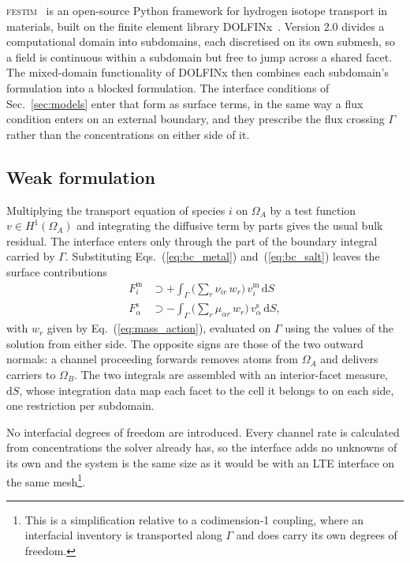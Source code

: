 \documentclass[5p]{elsarticle}
\newcommand{\FESTIM}{\textsc{festim}}
\begin{document}
\FESTIM{}~\cite{dark_festim_2026} is an open-source Python framework for hydrogen isotope transport in materials, built on the finite element library DOLFINx~\cite{baratta_dolfinx_2023}.
Version 2.0 divides a computational domain into subdomains, each discretised on its own submesh, so a field is continuous within a subdomain but free to jump across a shared facet.
The mixed-domain functionality of DOLFINx then combines each subdomain's formulation into a blocked formulation.
The interface conditions of Sec.~\ref{sec:models} enter that form as surface terms, in the same way a flux condition enters on an external boundary, and they prescribe the flux crossing $\Gamma$ rather than the concentrations on either side of it.

\subsection{Weak formulation}
\label{sec:weak}

Multiplying the transport equation of species $i$ on $\Omega_A$ by a test function $v \in H^1(\Omega_A)$ and integrating the diffusive term by parts gives the usual bulk residual.
The interface enters only through the part of the boundary integral carried by $\Gamma$.
Substituting Eqs.~(\ref{eq:bc_metal}) and~(\ref{eq:bc_salt}) leaves the surface contributions
\begin{align}
    F^{\mathrm{m}}_i &\supset
    +\int_\Gamma \Big(\sum_r \nu_{ir}\, w_r\Big)\,
        v^{\mathrm{m}}_i \,\mathrm{d}S
    \label{eq:weak_metal}\\
    F^{\mathrm{s}}_\alpha &\supset
    -\int_\Gamma \Big(\sum_r \mu_{\alpha r}\, w_r\Big)\,
        v^{\mathrm{s}}_\alpha \,\mathrm{d}S ,
    \label{eq:weak_salt}
\end{align}
with $w_r$ given by Eq.~(\ref{eq:mass_action}), evaluated on $\Gamma$ using the values of the solution from either side.
The opposite signs are those of the two outward normals: a channel proceeding forwards removes atoms from $\Omega_A$ and delivers carriers to $\Omega_B$.
The two integrals are assembled with an interior-facet measure, $\mathrm{d}S$, whose integration data map each facet to the cell it belongs to on each side, one restriction per subdomain.

No interfacial degrees of freedom are introduced.
Every channel rate is calculated from concentrations the solver already has, so the interface adds no unknowns of its own and the system is the same size as it would be with an LTE interface on the same mesh\footnote{This is a simplification relative to a codimension-1 coupling, where an interfacial inventory is transported along $\Gamma$ and does carry its own degrees of freedom.}.
\end{document}
